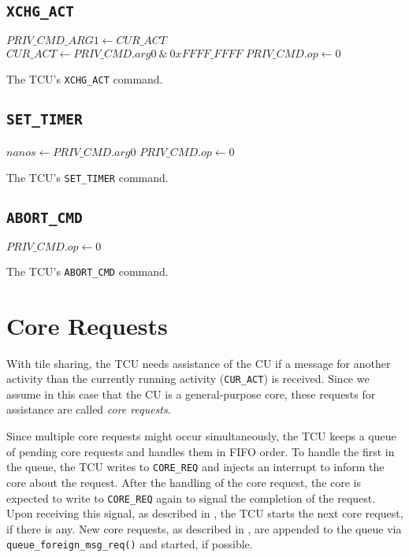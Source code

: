 \subsection{\texttt{XCHG\_ACT}}

\begin{algorithm}[H]
    $PRIV\_CMD\_ARG1 \gets CUR\_ACT$\;
    $CUR\_ACT \gets PRIV\_CMD.arg0\ \&\ 0xFFFF\_FFFF$\;
    \BlankLine
    $PRIV\_CMD.op \gets 0$\;
    \caption{The TCU's \texttt{XCHG\_ACT} command.}
\end{algorithm}

\subsection{\texttt{SET\_TIMER}}

\begin{algorithm}[H]
    $nanos \gets PRIV\_CMD.arg0$\;
    \BlankLine
    $PRIV\_CMD.op \gets 0$\;
    \caption{The TCU's \texttt{SET\_TIMER} command.}
\end{algorithm}

\subsection{\texttt{ABORT\_CMD}}

\begin{algorithm}[H]
    \BlankLine
    $PRIV\_CMD.op \gets 0$\;
    \caption{The TCU's \texttt{ABORT\_CMD} command.}
\end{algorithm}

\section{Core Requests}

With tile sharing, the TCU needs assistance of the CU if a message for another activity than the currently
running activity (\texttt{CUR\_ACT}) is received. Since we assume in this case that the CU is a
general-purpose core, these requests for assistance are called \emph{core requests}.

Since multiple core requests might occur simultaneously, the TCU keeps a queue of pending core
requests and handles them in FIFO order. To handle the first in the queue, the TCU writes to
\texttt{CORE\_REQ} and injects an interrupt to inform the core about the request. After the handling
of the core request, the core is expected to write to \texttt{CORE\_REQ} again to signal the
completion of the request. Upon receiving this signal, as described in ,
the TCU starts the next core request, if there is any. New core requests, as described in
, are appended to the queue via \texttt{queue\_foreign\_msg\_req()} and
started, if possible.

